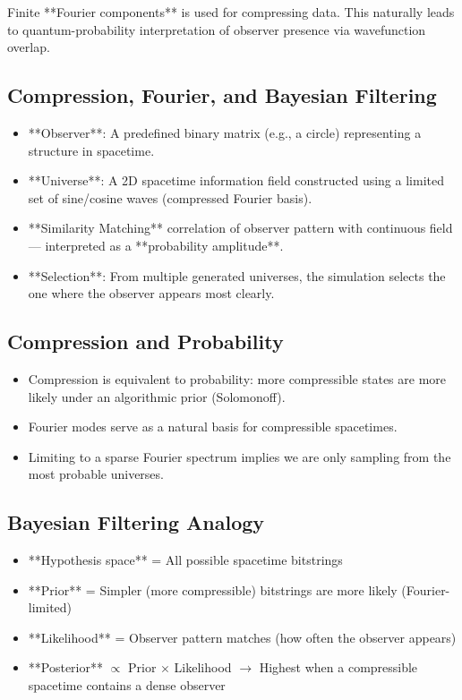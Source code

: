 \documentclass[12pt]{article}
\begin{document}
Finite **Fourier components** is used for compressing data.
This naturally leads to  quantum-probability interpretation of observer presence via wavefunction overlap.

\subsection{Compression, Fourier, and Bayesian Filtering}

\begin{itemize}
    \item **Observer**: A predefined binary matrix (e.g., a circle) representing a structure in spacetime.
    \item **Universe**: A 2D spacetime information field constructed using a limited set of sine/cosine waves (compressed Fourier basis).
    \item **Similarity Matching** correlation of observer pattern with continuous field — interpreted as a **probability amplitude**.
    \item **Selection**: From multiple generated universes, the simulation selects the one where the observer appears most clearly.
\end{itemize}

\subsection{Compression and Probability}

\begin{itemize}
    \item Compression is equivalent to probability: more compressible states are more likely under an algorithmic prior (Solomonoff).
    \item Fourier modes serve as a natural basis for compressible spacetimes.
    \item Limiting to a sparse Fourier spectrum implies we are only sampling from the most probable universes.
\end{itemize}

\subsection{Bayesian Filtering Analogy}


\begin{itemize}
    \item **Hypothesis space** = All possible spacetime bitstrings
    \item **Prior** = Simpler (more compressible) bitstrings are more likely (Fourier-limited)
    \item **Likelihood** = Observer pattern matches (how often the observer appears)
    \item **Posterior** $\propto$ Prior $\times$ Likelihood $\rightarrow$ Highest when a compressible spacetime contains a dense observer
\end{itemize}
\end{document}
